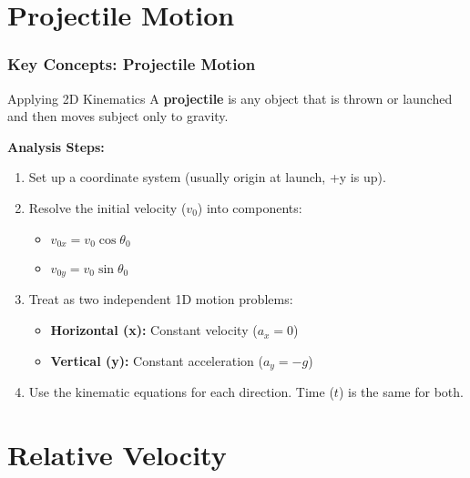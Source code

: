 \documentclass{beamer}
\begin{document}
\section{Projectile Motion}

\begin{frame}
\frametitle{Key Concepts: Projectile Motion}
\begin{block}{Applying 2D Kinematics}
A \textbf{projectile} is any object that is thrown or launched and then moves subject only to gravity.
\end{block}
\textbf{Analysis Steps:}
\begin{enumerate}
    \item Set up a coordinate system (usually origin at launch, +y is up).
    \item Resolve the initial velocity ($v_0$) into components:
    \begin{itemize}
        \item $v_{0x} = v_0 \cos \theta_0$
        \item $v_{0y} = v_0 \sin \theta_0$
    \end{itemize}
    \item Treat as two independent 1D motion problems:
    \begin{itemize}
        \item \textbf{Horizontal (x):} Constant velocity ($a_x = 0$)
        \item \textbf{Vertical (y):} Constant acceleration ($a_y = -g$)
    \end{itemize}
    \item Use the kinematic equations for each direction. Time ($t$) is the same for both.
\end{enumerate}
\end{frame}

\section{Relative Velocity}
\end{document}
